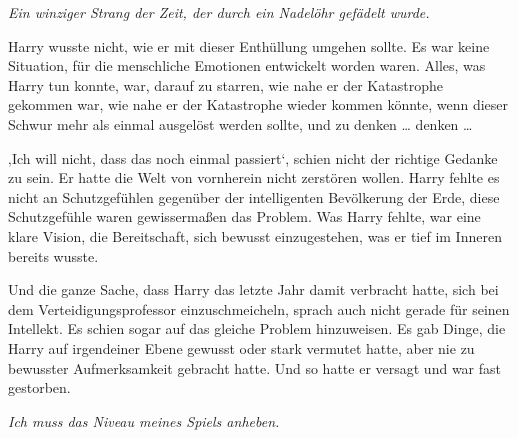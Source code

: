 \emph{Ein winziger Strang der Zeit, der durch ein Nadelöhr gefädelt wurde.}

Harry wusste nicht, wie er mit dieser Enthüllung umgehen sollte. Es war keine Situation, für die menschliche Emotionen entwickelt worden waren. Alles, was Harry tun konnte, war, darauf zu starren, wie nahe er der Katastrophe gekommen war, wie nahe er der Katastrophe wieder kommen könnte, wenn dieser Schwur mehr als einmal ausgelöst werden sollte, und zu denken … denken …

‚Ich will nicht, dass das noch einmal passiert‘, schien nicht der richtige Gedanke zu sein. Er hatte die Welt von vornherein nicht zerstören wollen. Harry fehlte es nicht an Schutzgefühlen gegenüber der intelligenten Bevölkerung der Erde, diese Schutzgefühle waren gewissermaßen das Problem. Was Harry fehlte, war eine klare Vision, die Bereitschaft, sich bewusst einzugestehen, was er tief im Inneren bereits wusste.

Und die ganze Sache, dass Harry das letzte Jahr damit verbracht hatte, sich bei dem Verteidigungsprofessor einzuschmeicheln, sprach auch nicht gerade für seinen Intellekt. Es schien sogar auf das gleiche Problem hinzuweisen. Es gab Dinge, die Harry auf irgendeiner Ebene gewusst oder stark vermutet hatte, aber nie zu bewusster Aufmerksamkeit gebracht hatte. Und so hatte er versagt und war fast gestorben.

\emph{Ich muss das Niveau meines Spiels anheben.}

